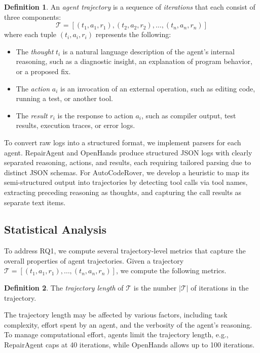 \documentclass[conference,10pt]{IEEEtran}
\theoremstyle{definition}        %
\newtheorem{definition}{Definition}
\newcommand{\ra}{Repair\-Agent}
\newcommand{\oh}{Open\-Hands}
\newcommand{\acr}{Auto\-Code\-Rover}
\begin{document}
\begin{definition}
\label{def:agent_trajectory}
An \emph{agent trajectory} is a sequence of \emph{iterations} that each consist of three components:
$$\mathcal{T} = [(t_1, a_1, r_1), (t_2, a_2, r_2), \dots, (t_n, a_n, r_n)]$$
where each tuple \((t_i, a_i, r_i)\) represents the following:
\begin{itemize}
	\item The \emph{thought} \(t_i\) is a natural language description of the agent's internal reasoning, such as a diagnostic insight, an explanation of program behavior, or a proposed fix.
	\item The \emph{action} \(a_i\) is an invocation of an external operation, such as editing code, running a test, or another tool.
	\item The \emph{result} \(r_i\) is the response to action \(a_i\), such as compiler output, test results, execution traces, or error logs.
\end{itemize}
\end{definition}

To convert raw logs into a structured format, we implement parsers for each agent. \ra{} and \oh{} produce structured JSON logs with clearly separated reasoning, actions, and results, each requiring tailored parsing due to distinct JSON schemas. For \acr{}, we develop a heuristic to map its semi-structured output into trajectories by detecting tool calls via tool names, extracting preceding reasoning as thoughts, and capturing the call results as separate text items.





\subsection{Statistical Analysis}

To address RQ1, we compute several trajectory-level metrics that capture the overall properties of agent trajectories.
Given a trajectory $\mathcal{T} = [(t_1, a_1, r_1), \dots, (t_n, a_n, r_n)]$, we compute the following metrics.

\begin{definition}
	The \emph{trajectory length} of $\mathcal{T}$ is the number $|\mathcal{T}|$ of iterations in the trajectory.
\end{definition}

The trajectory length may be affected by various factors, including task complexity, effort spent by an agent, and the verbosity of the agent's reasoning.
To manage computational effort, agents limit the trajectory length, e.g., \ra{} caps at 40 iterations, while \oh{} allows up to 100 iterations.
\end{document}
